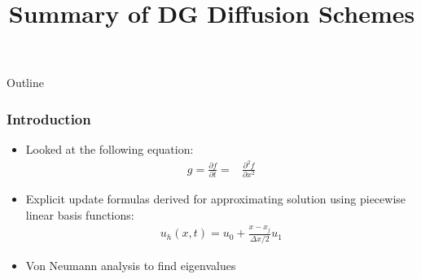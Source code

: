 \documentclass[serif,12pt]{beamer}
\title{Summary of DG Diffusion Schemes}
\begin{document}
\begin{frame}
  \titlepage
\end{frame}

\begin{frame}{Outline}
  \tableofcontents
\end{frame}

\begin{frame}
\frametitle{Introduction}
	\begin{itemize}
		\item Looked at the following equation:
			\begin{align*}
				g = \frac{\partial f}{\partial t}=& \frac{\partial^2 f}{\partial x^2}
			\end{align*}
		\item Explicit update formulas derived for approximating solution using piecewise linear basis functions:
		\begin{align*}
			u_h(x,t) = u_0 + \frac{x-x_j}{\Delta x / 2} u_1
		\end{align*}
		\item Von Neumann analysis to find eigenvalues
	\end{itemize}
\end{frame}
\end{document}
